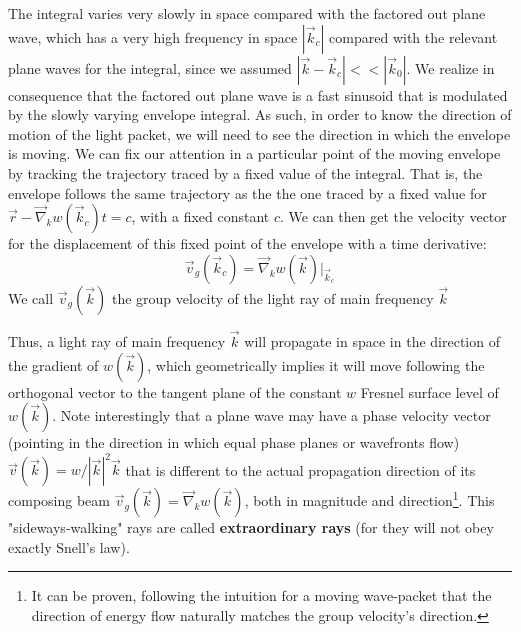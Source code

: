 \documentclass[11pt, a4paper, twoside]{article} %
\begin{document}
{The integral varies very slowly in space compared with the factored out plane wave, which has a very high frequency in space $|\vec{k}_c|$ compared with the relevant plane waves for the integral, since we assumed  $|\vec{k}-\vec{k}_c|<<|\vec{k}_0|$. We realize in consequence that the factored out plane wave is a fast sinusoid that is modulated by the slowly varying envelope integral. As such, in order to know the direction of motion of the light packet, we will need to see the direction in which the envelope is moving. We can fix our attention in a particular point of the moving envelope by tracking the trajectory traced by a fixed value of the integral. That is, the envelope follows the same trajectory as the the one traced by a fixed value for $\vec{r}-\vec{\nabla}_kw(\vec{k}_c)t=c$, with a fixed constant $c$. We can then get the velocity vector for the displacement of this fixed point of the envelope with a time derivative:
\begin{equation}
\vec{v}_g(\vec{k}_c)=\vec{\nabla}_kw(\vec{k})\Big\rvert_{\vec{k}_c}
\end{equation}
We call $\vec{v}_g(\vec{k})$ the group velocity of the light ray of main frequency $\vec{k}$
}

Thus, a light ray of main frequency $\vec{k}$ will propagate in space in the direction of the gradient of $w(\vec{k})$, which geometrically implies it will move following the orthogonal vector to the tangent plane of the constant $w$ Fresnel surface level of $w(\vec{k})$. Note interestingly that a plane wave may have a phase velocity vector (pointing in the direction in which equal phase planes or wavefronts flow) $\vec{v}(\vec{k})=w/|\vec{k}|^2\vec{k}$ that is different to the actual propagation direction of its composing beam $\vec{v}_g(\vec{k})=\vec{\nabla}_kw(\vec{k})$, both in magnitude and direction\footnote{It can be proven, following the intuition for a moving wave-packet that the direction of energy flow naturally matches the group velocity's direction.}. This "sideways-walking" rays are called {\bf extraordinary rays} (for they will not obey exactly Snell's law).\vspace{-0.2cm}
\end{document}
